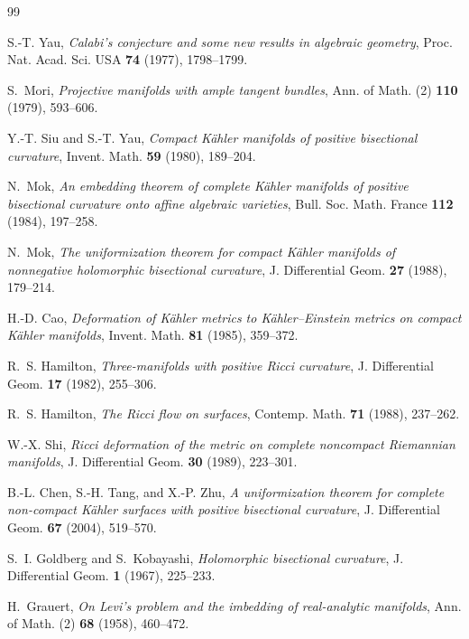 \documentclass[12pt,a4paper]{amsart}
\theoremstyle{definition}
\theoremstyle{remark}
\begin{document}
\begin{thebibliography}{99}

S.-T. Yau,
\textit{Calabi's conjecture and some new results in algebraic geometry},
Proc. Nat. Acad. Sci. USA \textbf{74} (1977), 1798--1799.

S.~Mori,
\textit{Projective manifolds with ample tangent bundles},
Ann. of Math. (2) \textbf{110} (1979), 593--606.

Y.-T. Siu and S.-T. Yau,
\textit{Compact Kähler manifolds of positive bisectional curvature},
Invent. Math. \textbf{59} (1980), 189--204.

N.~Mok,
\textit{An embedding theorem of complete Kähler manifolds of positive bisectional curvature onto affine algebraic varieties},
Bull. Soc. Math. France \textbf{112} (1984), 197--258.

N.~Mok,
\textit{The uniformization theorem for compact Kähler manifolds of nonnegative holomorphic bisectional curvature},
J. Differential Geom. \textbf{27} (1988), 179--214.

H.-D. Cao,
\textit{Deformation of Kähler metrics to Kähler--Einstein metrics on compact
Kähler manifolds},
Invent. Math. \textbf{81} (1985), 359--372.

R.~S. Hamilton,
\textit{Three-manifolds with positive Ricci curvature},
J. Differential Geom. \textbf{17} (1982), 255--306.

R.~S. Hamilton,
\textit{The Ricci flow on surfaces},
Contemp. Math. \textbf{71} (1988), 237--262.

W.-X. Shi,
\textit{Ricci deformation of the metric on complete noncompact Riemannian
manifolds},
J. Differential Geom. \textbf{30} (1989), 223--301.

B.-L. Chen, S.-H. Tang, and X.-P. Zhu,
\textit{A uniformization theorem for complete non-compact Kähler surfaces
with positive bisectional curvature},
J. Differential Geom. \textbf{67} (2004), 519--570.

S.~I. Goldberg and S.~Kobayashi,
\textit{Holomorphic bisectional curvature},
J. Differential Geom. \textbf{1} (1967), 225--233.

H.~Grauert,
\textit{On Levi's problem and the imbedding of real-analytic manifolds},
Ann. of Math. (2) \textbf{68} (1958), 460--472.


\end{thebibliography}
\end{document}
